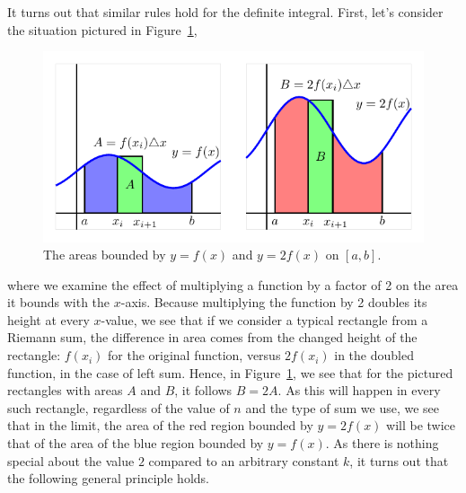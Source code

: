 It turns out that similar rules hold for the definite integral.  First, let's consider the situation pictured in Figure~\ref{F:4.3.ConstMult},
\begin{figure}[h]
\begin{center}
\includegraphics{figures/4_3_ConstMult}
\caption{The areas bounded by $y = f(x)$ and $y = 2f(x)$ on $[a,b]$.\label{F:4.3.ConstMult}} 
\end{center}
\end{figure}
where we examine the effect of multiplying a function by a factor of 2 on the area it bounds with the $x$-axis.  Because multiplying the function by 2 doubles its height at every $x$-value, we see that if we consider a typical rectangle from a Riemann sum, the difference in area comes from the changed height of the rectangle:  $f(x_i)$ for the original function, versus $2f(x_i)$ in the doubled function, in the case of left sum.  Hence, in Figure~\ref{F:4.3.ConstMult}, we see that for the pictured rectangles with areas $A$ and $B$, it follows $B = 2A$.  As this will happen in every such rectangle, regardless of the value of $n$ and the type of sum we use, we see that in the limit, the area of the red region bounded by $y = 2f(x)$ will be twice that of the area of the blue region bounded by $y = f(x)$.  As there is nothing special about the value $2$ compared to an arbitrary constant $k$, it turns out that the following general principle holds.

\vspace*{5pt}
\noindent {}
\vspace*{1pt}

